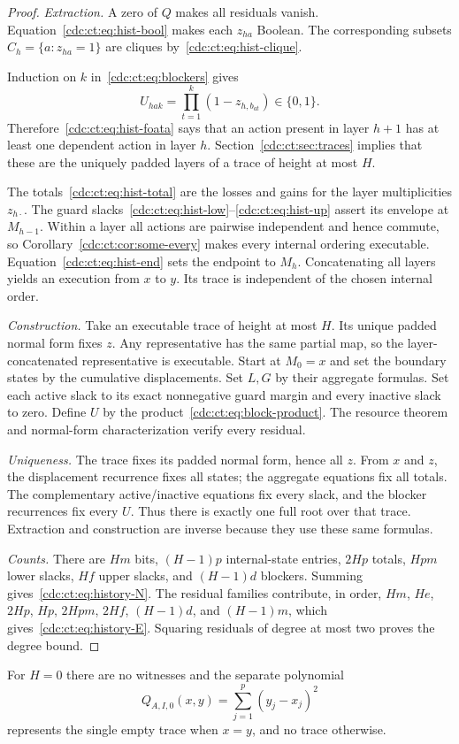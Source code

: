 \documentclass[11pt,a4paper]{article}
\theoremstyle{definition}
\theoremstyle{remark}
\begin{document}
\begin{proof}
\emph{Extraction.} A zero of $Q$ makes all residuals vanish. Equation~\eqref{cdc:ct:eq:hist-bool} makes each $z_{ha}$ Boolean. The corresponding subsets $C_h=\{a:z_{ha}=1\}$ are cliques by~\eqref{cdc:ct:eq:hist-clique}.

Induction on $k$ in~\eqref{cdc:ct:eq:blockers} gives
\begin{equation}\label{cdc:ct:eq:block-product}
 U_{hak}=\prod_{t=1}^k(1-z_{h,b_{at}})\in\{0,1\}.
\end{equation}
Therefore~\eqref{cdc:ct:eq:hist-foata} says that an action present in layer $h+1$ has at least one dependent action in layer $h$. Section~\ref{cdc:ct:sec:traces} implies that these are the uniquely padded layers of a trace of height at most $H$.

The totals~\eqref{cdc:ct:eq:hist-total} are the losses and gains for the layer multiplicities $z_{h\cdot}$. The guard slacks~\eqref{cdc:ct:eq:hist-low}--\eqref{cdc:ct:eq:hist-up} assert its envelope at $M_{h-1}$. Within a layer all actions are pairwise independent and hence commute, so Corollary~\ref{cdc:ct:cor:some-every} makes every internal ordering executable. Equation~\eqref{cdc:ct:eq:hist-end} sets the endpoint to $M_h$. Concatenating all layers yields an execution from $x$ to $y$. Its trace is independent of the chosen internal order.

\emph{Construction.} Take an executable trace of height at most $H$. Its unique padded normal form fixes $z$. Any representative has the same partial map, so the layer-concatenated representative is executable. Start at $M_0=x$ and set the boundary states by the cumulative displacements. Set $L,G$ by their aggregate formulas. Set each active slack to its exact nonnegative guard margin and every inactive slack to zero. Define $U$ by the product~\eqref{cdc:ct:eq:block-product}. The resource theorem and normal-form characterization verify every residual.

\emph{Uniqueness.} The trace fixes its padded normal form, hence all $z$. From $x$ and $z$, the displacement recurrence fixes all states; the aggregate equations fix all totals. The complementary active/inactive equations fix every slack, and the blocker recurrences fix every $U$. Thus there is exactly one full root over that trace. Extraction and construction are inverse because they use these same formulas.

\emph{Counts.} There are $Hm$ bits, $(H-1)p$ internal-state entries, $2Hp$ totals, $Hpm$ lower slacks, $Hf$ upper slacks, and $(H-1)d$ blockers. Summing gives~\eqref{cdc:ct:eq:history-N}. The residual families contribute, in order, $Hm$, $He$, $2Hp$, $Hp$, $2Hpm$, $2Hf$, $(H-1)d$, and $(H-1)m$, which gives~\eqref{cdc:ct:eq:history-E}. Squaring residuals of degree at most two proves the degree bound.
\end{proof}
For $H=0$ there are no witnesses and the separate polynomial
\[
 Q_{A,I,0}(x,y)=\sum_{j=1}^p(y_j-x_j)^2
\]
represents the single empty trace when $x=y$, and no trace otherwise.
\end{document}
